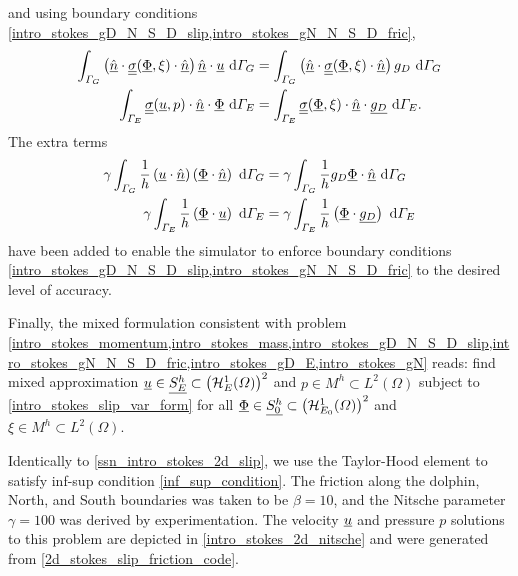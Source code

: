 and using boundary conditions \cref{intro_stokes_gD_N_S_D_slip,intro_stokes_gN_N_S_D_fric}, 
\begin{align*}
  \int_{\varGamma_G} \left( \underline{\hat{n}} \cdot \underline{\underline{\sigma}}(\underline{\Phi},\xi) \cdot \underline{\hat{n}} \right) \underline{\hat{n}} \cdot \underline{u}  \ \mathrm{d}\varGamma_G &= \int_{\varGamma_G} \left( \underline{\hat{n}} \cdot \underline{\underline{\sigma}}(\underline{\Phi},\xi) \cdot \underline{\hat{n}} \right) g_D \ \mathrm{d}\varGamma_G \\
  \int_{\varGamma_E} \underline{\underline{\sigma}}(\underline{u},p) \cdot \underline{\hat{n}} \cdot \underline{\Phi} \ \mathrm{d}\varGamma_E &= \int_{\varGamma_E} \underline{\underline{\sigma}}(\underline{\Phi},\xi) \cdot \underline{\hat{n}} \cdot \underline{g_D} \ \mathrm{d}\varGamma_E.
\end{align*}
The extra terms
\begin{align*}
  \gamma \int_{\varGamma_G} \frac{1}{h} \left( \underline{u} \cdot \underline{\hat{n}} \right) \left( \underline{\Phi} \cdot \underline{\hat{n}} \right) \ \mathrm{d}\varGamma_G &= \gamma \int_{\varGamma_G} \frac{1}{h} g_D \underline{\Phi} \cdot \underline{\hat{n}} \ \mathrm{d}\varGamma_G \\
  \gamma \int_{\varGamma_E} \frac{1}{h} \left( \underline{\Phi} \cdot \underline{u} \right) \ \mathrm{d}\varGamma_E &= \gamma \int_{\varGamma_E} \frac{1}{h} \left( \underline{\Phi} \cdot \underline{g_D} \right) \ \mathrm{d}\varGamma_E
\end{align*}
have been added to enable the simulator to enforce boundary conditions \cref{intro_stokes_gD_N_S_D_slip,intro_stokes_gN_N_S_D_fric} to the desired level of accuracy.  

Finally, the mixed formulation  consistent with problem \cref{intro_stokes_momentum,intro_stokes_mass,intro_stokes_gD_N_S_D_slip,intro_stokes_gN_N_S_D_fric,intro_stokes_gD_E,intro_stokes_gN} reads: find mixed approximation $\underline{u} \in \underline{S_E^h} \subset \left( \mathcal{H}_E^1(\varOmega) \right)^2$ and $p \in M^h \subset L^2(\Omega)$ subject to \cref{intro_stokes_slip_var_form} for all $\underline{\Phi} \in \underline{S_0^h} \subset \left( \mathcal{H}_{E_0}^1(\varOmega) \right)^2$ and $\xi \in M^h \subset L^2(\Omega)$.

Identically to \cref{ssn_intro_stokes_2d_slip}, we use the Taylor-Hood element to satisfy inf-sup condition \cref{inf_sup_condition}.
The friction along the dolphin, North, and South boundaries was taken to be $\beta = 10$, and the Nitsche parameter $\gamma = 100$ was derived by experimentation.  The velocity $\underline{u}$ and pressure $p$ solutions to this problem are depicted in \cref{intro_stokes_2d_nitsche} and were generated from \cref{2d_stokes_slip_friction_code}.



